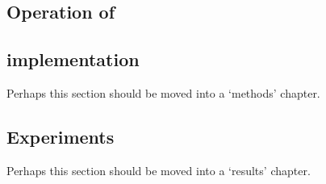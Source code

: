 \chapter{}

\section{Operation of }

\section{}

\section{ implementation}

Perhaps this section should be moved into a `methods' chapter.

\section{Experiments}

Perhaps this section should be moved into a `results' chapter.